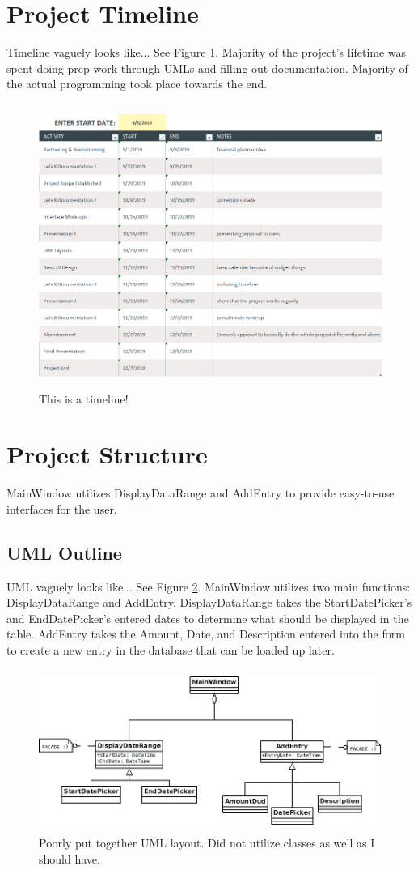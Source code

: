 \documentclass[10pt,conference,onecolumn,compsoc]{IEEEtran}
\begin{document}
\section{Project Timeline}
Timeline vaguely looks like... See Figure \ref{Timeline}. Majority of the project's lifetime was spent doing prep work through UMLs and filling out documentation. Majority of the actual programming took place towards the end.

\begin{figure}[ht!]
\includegraphics[height=350px, width=500px]{Timeline.png}
\caption{This is a timeline!}
\label{Timeline}
\end{figure}

\section{Project Structure}
MainWindow utilizes DisplayDataRange and AddEntry to provide easy-to-use interfaces for the user.

\subsection{UML Outline}
UML vaguely looks like... See Figure \ref{UML}. MainWindow utilizes two main functions: DisplayDataRange and AddEntry. DisplayDataRange takes the StartDatePicker's and EndDatePicker's entered dates to determine what should be displayed in the table. AddEntry takes the Amount, Date, and Description entered into the form to create a new entry in the database that can be loaded up later.

\begin{figure}[ht!]
\includegraphics[height=200px, width=500px]{FinancialDMDiagram.jpg}
\caption{Poorly put together UML layout. Did not utilize classes as well as I should have.}
\label{UML}
\end{figure}
\end{document}
